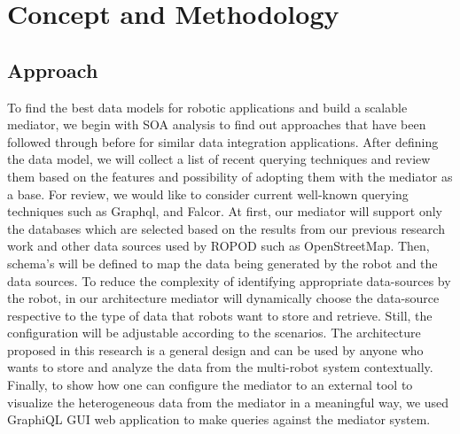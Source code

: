 

	\let\cleardoublepage\clearpage
\chapter{Concept and Methodology}

\section{Approach}\label{sec:approach}
To find the best data models for robotic applications and build a scalable mediator, we begin with SOA analysis to find out approaches that have been followed through before for similar data integration applications. After defining the data model, we will collect a list of recent querying techniques and review them based on the features and possibility of adopting them with the mediator as a base.  For review, we would like to consider current well-known querying techniques such as Graphql, and Falcor. At first, our mediator will support only the databases which are selected based on the results from our previous research work \cite{ravichandranworkbench} and other data sources used by ROPOD such as OpenStreetMap. Then, schema's will be defined to map the data being generated by the robot and the data sources. To reduce the complexity of identifying appropriate data-sources by the robot, in our architecture mediator will dynamically choose the data-source respective to the type of data that robots want to store and retrieve. Still, the configuration will be adjustable according to the scenarios. The architecture proposed in this research is a general design and can be used by anyone who wants to store and analyze the data from the multi-robot system contextually. Finally, to show how one can configure the mediator to an external tool to visualize the heterogeneous data from the mediator in a meaningful way, we used GraphiQL GUI web application to make queries against the mediator system.

